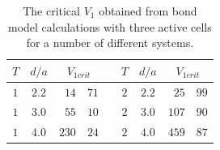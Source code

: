 \begin{table}
  \center
  \begin{tabular}{c c r @{.} l p{0cm} c c r @{.} l}
    $T$ & $d/a$ & \multicolumn{2}{c}{$V_{1crit}$} & &
    $T$ & $d/a$ & \multicolumn{2}{c}{$V_{1crit}$} \\
    \hline 
    $1$ & $2.2$ & $ 14$&$71$ & &
    $2$ & $2.2$ & $ 25$&$99$ \\
    $1$ & $3.0$ & $ 55$&$10$ & &
    $2$ & $3.0$ & $107$&$90$ \\
    $1$ & $4.0$ & $230$&$24$ & &
    $2$ & $4.0$ & $459$&$87$ \\
  \end{tabular}
  \caption{
  The critical $V_1$ obtained from bond model calculations with three active
  cells for a number of different systems.
  }
  \label{tab:critical_V1}
\end{table}

